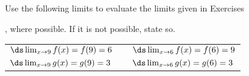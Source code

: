 \begin{exerciseset}{Use the following limits to evaluate the limits given in Exercises}{, where possible. If it is not possible, state so.

\begin{tabular}{lll}
$\ds \lim_{x\to9}f(x) = f(9) = 6$ & \quad\quad &$\ds \lim_{x\to6} f(x) = f(6) = 9$\\
$\ds \lim_{x\to9}g(x) = g(9) = 3$ &  & $\ds \lim_{x\to6} g(x) = g(6) = 3$
\end{tabular}}









\end{exerciseset}
